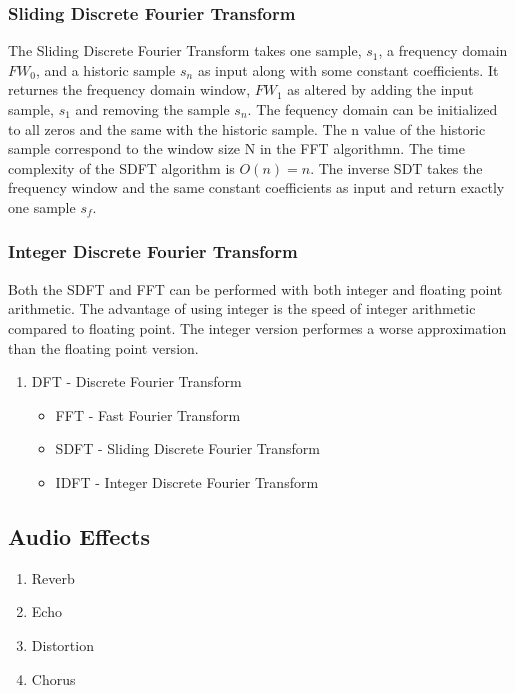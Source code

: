 \subsubsection{Sliding Discrete Fourier Transform}
The Sliding Discrete Fourier Transform takes one sample, $s_1$, a
frequency domain $FW_0$, and a historic sample $s_n$ as input along with some
constant coefficients.
It returnes the frequency domain window, $FW_1$ as altered by adding the input
sample, $s_1$ and removing the sample $s_n$. The fequency domain can be
initialized to all zeros and the same with the historic sample. The n value of
the historic sample correspond to the window size N in the FFT algorithmn. The
time complexity of the SDFT algorithm is $O(n) = n$. The inverse SDT takes the
frequency window and the same constant coefficients as input and return exactly
one sample $s_f$.

\subsubsection{Integer Discrete Fourier Transform}
Both the SDFT and FFT can be performed with both
integer and floating point arithmetic. The advantage
of using integer is the speed of integer arithmetic compared to floating point.
The integer version performes a worse approximation than the floating point
version. 

\begin{enumerate}
\item DFT - Discrete Fourier Transform
	\begin{itemize}
	  \item FFT - Fast Fourier Transform
		\item SDFT - Sliding Discrete Fourier Transform
		\item IDFT - Integer Discrete Fourier Transform
	\end{itemize}
\end{enumerate}

\subsection{Audio Effects}

\begin{enumerate}
	\item Reverb
	\item Echo
	\item Distortion
	\item Chorus
\end{enumerate}

